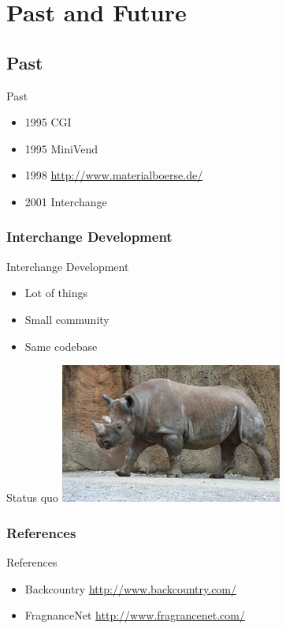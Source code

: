 \section{Past and Future}

\subsection{Past}
\begin{frame}{Past}
\begin{itemize}
\item 1995 CGI
\item 1995 MiniVend
\item 1998 \url{http://www.materialboerse.de/}
\item 2001 Interchange
\end{itemize}
\end{frame}

\subsubsection{Interchange Development}

\begin{frame}{Interchange Development}
\begin{itemize}
\item Lot of things
\item Small community
\item Same codebase
\end{itemize}
\end{frame}


\begin{frame}{Status quo}
  \includegraphics{rhino.jpg}
\end{frame}

\subsubsection{References}
\begin{frame}{References}
\begin{itemize}
\item Backcountry \url{http://www.backcountry.com/}
\item FragnanceNet \url{http://www.fragrancenet.com/}
\end{itemize}
\end{frame}

